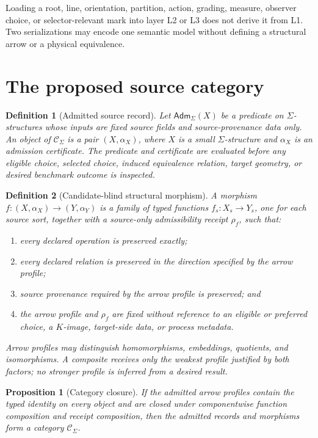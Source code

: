 \documentclass[11pt]{article}
\newtheorem{definition}{Definition}
\newtheorem{proposition}{Proposition}
\begin{document}
Loading a root, line, orientation, partition, action, grading, measure,
observer choice, or selector-relevant mark into layer L2 or L3 does not derive
it from L1. Two serializations may encode one semantic model without defining
a structural arrow or a physical equivalence.

\section{The proposed source category}

\begin{definition}[Admitted source record]
Let \(\mathsf{Adm}_{\Sigma}(X)\) be a predicate on \(\Sigma\)-structures whose
inputs are fixed source fields and source-provenance data only. An object of
\(\mathcal C_{\Sigma}\) is a pair \((X,\alpha_X)\), where \(X\) is a small
\(\Sigma\)-structure and \(\alpha_X\) is an admission certificate. The
predicate and certificate are evaluated before any eligible choice, selected
choice, induced equivalence relation, target geometry, or desired benchmark
outcome is inspected.
\end{definition}

\begin{definition}[Candidate-blind structural morphism]
A morphism \(f:(X,\alpha_X)\to(Y,\alpha_Y)\) is a family of typed functions
\(f_s:X_s\to Y_s\), one for each source sort, together with a source-only
admissibility receipt \(\rho_f\), such that:
\begin{enumerate}[label=(M\arabic*)]
  \item every declared operation is preserved exactly;
  \item every declared relation is preserved in the direction specified by
  the arrow profile;
  \item source provenance required by the arrow profile is preserved; and
  \item the arrow profile and \(\rho_f\) are fixed without reference to an
  eligible or preferred choice, a \(K\)-image, target-side data, or process
  metadata.
\end{enumerate}
Arrow profiles may distinguish homomorphisms, embeddings, quotients, and
isomorphisms. A composite receives only the weakest profile justified by both
factors; no stronger profile is inferred from a desired result.
\end{definition}

\begin{proposition}[Category closure]
If the admitted arrow profiles contain the typed identity on every object and
are closed under componentwise function composition and receipt composition,
then the admitted records and morphisms form a category
\(\mathcal C_{\Sigma}\).
\end{proposition}
\end{document}
